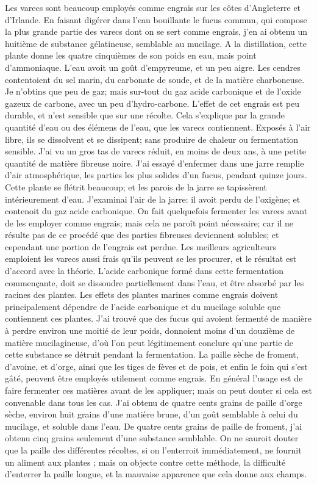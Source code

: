 Les varecs sont beaucoup employés comme engrais sur les côtes d'Angleterre et d'Irlande. En faisant digérer dans l'eau bouillante le fucus commun, qui compose la plus grande partie des varecs dont on se sert comme engrais, j'en ai obtenu un huitième de substance gélatineuse, semblable au mucilage. A la distillation, cette plante donne les quatre cinquièmes de son poids en eau, mais point d'ammoniaque. L'eau avoit un goût d'empyreume,\setcounter{page}{161} et un peu aigre. Les cendres contentoient du sel marin, du carbonate de soude, et de la matière charboneuse. Je n'obtins que peu de gaz; mais sur-tout du gaz acide carbonique et de l'oxide gazeux de carbone, avec un peu d'hydro-carbone. L'effet de cet engrais est peu durable, et n'est sensible que sur une récolte. Cela s'explique par la grande quantité d'eau ou des élémens de l'eau, que les varecs contiennent. Exposés à l'air libre, ils se dissolvent et se dissipent; sans produire de chaleur ou fermentation sensible. J'ai vu un gros tas de varecs réduit, en moins de deux ans, à une petite quantité de matière fibreuse noire.
J'ai essayé d'enfermer dans une jarre remplie d'air atmosphérique, les parties les plus solides d'un fucus, pendant quinze jours. Cette plante se flétrit beaucoup; et les parois de la jarre se tapissèrent intérieurement d'eau. J'examinai l'air de la jarre: il avoit perdu de l'oxigène; et contenoit du gaz acide carbonique.
On fait quelquefois fermenter les varecs avant de les employer comme engrais; mais cela ne paroît point nécessaire; car il ne résulte pas de ce procédé que des parties\setcounter{page}{162} fibreuses deviennent solubles; et cependant une portion de l'engrais est perdue.
Les meilleurs agriculteurs emploient les varecs aussi frais qu'ils peuvent se les procurer, et le résultat est d'accord avec la théorie. L'acide carbonique formé dans cette fermentation commençante, doit se dissoudre partiellement dans l'eau, et être absorbé par les racines des plantes.
Les effets des plantes marines comme engrais doivent principalement dépendre de l'acide carbonique et du mucilage soluble que contiennent ces plantes. J'ai trouvé que des fucus qui avoient fermenté de manière à perdre environ une moitié de leur poids, donnoient moins d'un douzième de matière mucilagineuse, d'où l'on peut légitimement conclure qu'une partie de cette substance se détruit pendant la fermentation.
La paille sèche de froment, d'avoine, et d'orge, ainsi que les tiges de fèves et de pois, et enfin le foin qui s'est gâté, peuvent être employés utilement comme engrais. En général l'usage est de faire fermenter ces matières avant de les appliquer; mais on peut douter si cela est convenable dans tous les cas. J'ai obtenu de quatre cents grains de paille d'orge sèche, environ huit grains d'une matière\setcounter{page}{163} brune, d'un goût semblable à celui du mucilage, et soluble dans l'eau. De quatre cents grains de paille de froment, j'ai obtenu cinq grains seulement d'une substance semblable. On ne sauroit douter que la paille des différentes récoltes, si on l'enterroit immédiatement, ne fournit un aliment aux plantes ; mais on objecte contre cette méthode, la difficulté d'enterrer la paille longue, et la mauvaise apparence que cela donne aux champs.
